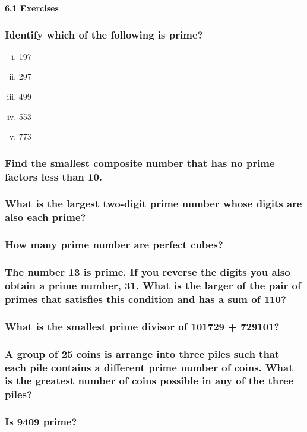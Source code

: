 \documentclass[a4paper,10pt]{article}
\begin{document}
\Large{\textbf{6.1 Exercises}
\subsubsection{Identify which of the following is prime?}
\begin{multicols}{3}
\begin{enumerate}[(i)]
\item 197
\item 297
\item 499
\item 553
\item 773
\end{enumerate}
\end{multicols}
\subsubsection{Find the smallest composite number that has no prime
factors less than 10.}
\subsubsection{What is the largest two-digit prime number whose digits
are also each prime?}
\subsubsection{How many prime number are perfect cubes?}
\subsubsection{The number 13 is prime. If you reverse the digits you
also obtain a prime number, 31.
What is the larger of the pair of primes that satisfies this condition
and has a sum of 110?}
\subsubsection{What is the smallest prime divisor of 101729 + 729101?}
\subsubsection{A group of 25 coins is arrange into three piles such that
each pile contains a different
prime number of coins. What is the greatest number of coins possible in
any of the three
piles?}
\subsubsection{Is 9409 prime?}
}
\end{document}

